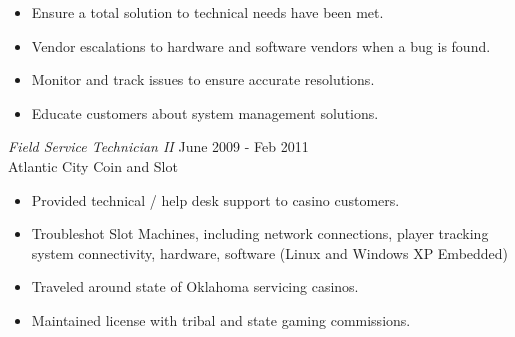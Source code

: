 \documentclass[margin]{res}
\begin{document}
\begin{resume}
\begin{itemize}
 		\item Ensure a total solution to technical needs have been met.
 		\item Vendor escalations to hardware and software vendors when a bug is found.
 		\item Monitor and track issues to ensure accurate resolutions.
 		\item Educate customers about system management solutions.
 	\end{itemize}
 	{\sl Field Service Technician II} \hfill June 2009 - Feb 2011 \\
 	Atlantic City Coin and Slot
 	\begin{itemize}  \itemsep -2pt %
 		\item Provided technical / help desk support to casino customers.
 		\item Troubleshot Slot Machines, including network connections, player tracking system connectivity, hardware, software (Linux and Windows XP Embedded)
 		\item Traveled around state of Oklahoma servicing casinos.
 		\item Maintained license with tribal and state gaming commissions.
 	\end{itemize} 	
\end{resume}
\end{document}

